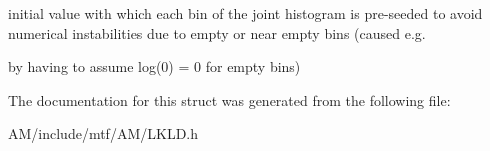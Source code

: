 initial value with which each bin of the joint histogram is pre-\/seeded to avoid numerical instabilities due to empty or near empty bins (caused e.\-g. 

by having to assume log(0) = 0 for empty bins) 

The documentation for this struct was generated from the following file\-:\begin{DoxyCompactItemize}
\item 
A\-M/include/mtf/\-A\-M/L\-K\-L\-D.\-h\end{DoxyCompactItemize}
